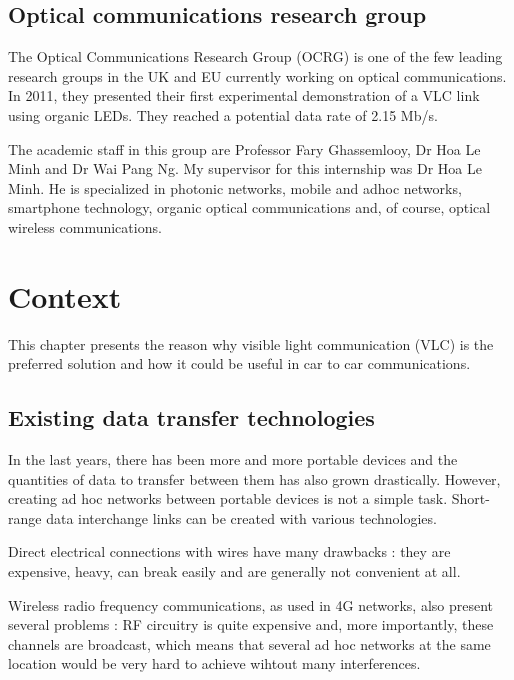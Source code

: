 \documentclass[12pt]{report}
\begin{document}
\subsection{Optical communications research group}

The Optical Communications Research Group (OCRG) is one of the few leading research groups in the UK and EU currently working on optical communications.
In 2011, they presented their first experimental demonstration of a VLC link using organic LEDs. They reached a potential data rate of 2.15 Mb/s.

The academic staff in this group are Professor Fary Ghassemlooy, Dr Hoa Le Minh and Dr Wai Pang Ng.
My supervisor for this internship was Dr Hoa Le Minh. He is specialized in photonic networks, mobile and adhoc networks, smartphone technology, organic optical communications and, of course, optical wireless communications.












\section{Context}

This chapter presents the reason why visible light communication (VLC) is the preferred solution and how it could be useful in car to car communications.

\subsection{Existing data transfer technologies}

In the last years, there has been more and more portable devices and the quantities of data to transfer between them has also grown drastically. However, creating ad hoc networks between portable devices is not a simple task. Short-range data interchange links can be created with various technologies.

Direct electrical connections with wires have many drawbacks : they are expensive, heavy, can break easily and are generally not convenient at all.

Wireless radio frequency communications, as used in 4G networks, also present several problems : RF circuitry is quite expensive and, more importantly, these channels are broadcast, which means that several ad hoc networks at the same location would be very hard to achieve wihtout many interferences.
\end{document}
